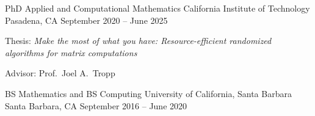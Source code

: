 

\begin{cventries}

  \cventry
    {PhD Applied and Computational Mathematics} %
    {California Institute of Technology} %
    {Pasadena, CA} %
    {September 2020 -- June 2025} %
    {
      \begin{cvitems} %
      \item {Thesis: \emph{Make the most of what you have: Resource-efficient randomized algorithms for matrix computations}}
        \item {Advisor: Prof.\ Joel A.\ Tropp}
      \end{cvitems}
    }

  \cventry
    {BS Mathematics and BS Computing} %
    {University of California, Santa Barbara} %
    {Santa Barbara, CA} %
    {September 2016 -- June 2020} %
    {
    }

\end{cventries}
